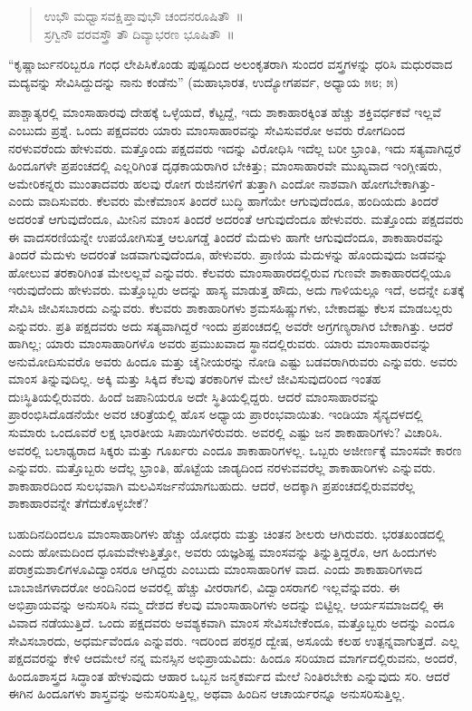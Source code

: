 \begin{verse}
ಉಭೌ ಮಧ್ವಾಸವಕ್ಷಿಪ್ತಾವುಭೌ ಚಂದನರೂಷಿತೌ~॥\\ಸ್ರಗ್ವಿನೌ ವರವಸ್ತ್ರೌ ತೌ ದಿವ್ಯಾಭರಣ ಭೂಷಿತೌ~॥
\end{verse}

“ಕೃಷ್ಣಾರ್ಜುನರಿಬ್ಬರೂ ಗಂಧ ಲೇಪಿಸಿಕೊಂಡು ಪುಷ್ಪದಿಂದ ಅಲಂಕೃತರಾಗಿ ಸುಂದರ ವಸ್ತ್ರಗಳನ್ನು ಧರಿಸಿ ಮಧುರವಾದ ಮದ್ಯವನ್ನು ಸೇವಿಸಿದ್ದುದನ್ನು ನಾನು ಕಂಡೆನು” (ಮಹಾಭಾರತ, ಉದ್ಯೋಗಪರ್ವ, ಅಧ್ಯಾಯ ೫೮; ೫)

ಪಾಶ್ಚಾತ್ಯರಲ್ಲಿ ಮಾಂಸಾಹಾರವು ದೇಹಕ್ಕೆ ಒಳ್ಳೆಯದೆ, ಕೆಟ್ಟದ್ದೆ, ಇದು ಶಾಕಾಹಾರಕ್ಕಿಂತ ಹೆಚ್ಚು ಶಕ್ತಿವರ್ಧಕವೆ ಇಲ್ಲವೆ ಎಂಬುದು ಪ್ರಶ್ನೆ. ಒಂದು ಪಕ್ಷದವರು ಯಾರು ಮಾಂಸಾಹಾರ\break ವನ್ನು ಸೇವಿಸುವರೋ ಅವರು ರೋಗದಿಂದ ನರಳುವರೆಂದು ಹೇಳುವರು. ಮತ್ತೊಂದು ಪಕ್ಷದವರು ಇದನ್ನು ವಿರೋಧಿಸಿ ಇದೆಲ್ಲ ಬರೀ ಭ್ರಾಂತಿ, ಇದು ಸತ್ಯವಾಗಿದ್ದರೆ ಹಿಂದೂಗಳೇ ಪ್ರಪಂಚದಲ್ಲಿ ಎಲ್ಲರಿಗಿಂತ ದೃಢಕಾಯರಾಗಿರ ಬೇಕಿತ್ತು; ಮಾಂಸಾಹಾರವೇ ಮುಖ್ಯವಾದ ಇಂಗ್ಲೀಷರು, ಅಮೇರಿಕನ್ನರು ಮುಂತಾದವರು ಹಲವು ರೋಗ ರುಜಿನಗಳಿಗೆ ತುತ್ತಾಗಿ ಎಂದೋ ನಾಶವಾಗಿ ಹೋಗಬೇಕಾಗಿತ್ತು- ಎಂದು ವಾದಿಸುವರು. ಕೆಲವರು ಮೇಕೆಮಾಂಸ ತಿಂದರೆ ಬುದ್ಧಿ ಹಾಗೆಯೇ ಆಗುವುದೆಂದೂ, ಹಂದಿಯದು ತಿಂದರೆ ಅದರಂತೆ ಆಗುವುದೆಂದೂ, ಮೀನಿನ ಮಾಂಸ ತಿಂದರೆ ಅದರಂತೆ ಆಗುವುದೆಂದೂ ಹೇಳುವರು. ಮತ್ತೊಂದು ಪಕ್ಷದವರು ಈ ವಾದಸರಣಿಯನ್ನೇ ಉಪಯೋಗಿಸುತ್ತ ಆಲೂಗಡ್ಡೆ ತಿಂದರೆ ಮೆದುಳು ಹಾಗೇ ಆಗುವುದೆಂದೂ, ಶಾಕಾಹಾರವನ್ನು ತಿಂದರೆ ಮೆದುಳು ಅದರಂತೆ ಜಡವಾಗುವುದೆಂದೂ, ಹೇಳುವರು. ಪ್ರಾಣಿಯ ಮೆದುಳನ್ನು ಹೊಂದುವುದು ಜಡವನ್ನು ಹೋಲುವ ತರಕಾರಿಗಿಂತ ಮೇಲಲ್ಲವೆ ಎನ್ನುವರು. ಕೆಲವರು ಮಾಂಸಾಹಾರದಲ್ಲಿರುವ ಗುಣವೇ ಶಾಕಾಹಾರದಲ್ಲಿಯೂ ಇರುವುದೆಂದು ಹೇಳುವರು. ಮತ್ತೊಬ್ಬರು ಅದನ್ನು ಹಾಸ್ಯ ಮಾಡುತ್ತ ಹೌದು, ಅದು ಗಾಳಿಯಲ್ಲೂ ಇದೆ, ಅದನ್ನೇ ಏತಕ್ಕೆ ಸೇವಿಸಿ ಜೀವಿಸಬಾರದು ಎನ್ನುವರು. ಕೆಲವರು ಶಾಕಾಹಾರಿಗಳು ಶ್ರಮಸಹಿಷ್ಣುಗಳು, ಬೇಕಾದಷ್ಟು ಕೆಲಸ ಮಾಡಬಲ್ಲರು ಎನ್ನುವರು. ಪ್ರತಿ ಪಕ್ಷದವರು ಅದು ಸತ್ಯವಾಗಿದ್ದರೆ ಇಂದು ಪ್ರಪಂಚದಲ್ಲಿ ಅವರೇ ಅಗ್ರಗಣ್ಯರಾಗಿರ ಬೇಕಾಗಿತ್ತು. ಆದರೆ ಹಾಗಿಲ್ಲ; ಯಾರು ಮಾಂಸಾಹಾರಿಗಳೊ ಅವರು ಪ್ರಮುಖವಾದ ಸ್ಥಾನದಲ್ಲಿರುವರು. ಯಾರು ಮಾಂಸಾಹಾರವನ್ನು ಅನುಮೋದಿಸುವರೊ ಅವರು ಹಿಂದೂ ಮತ್ತು ಚೈನೀಯರನ್ನು ನೋಡಿ ಎಷ್ಟು ಬಡವರಾಗಿರುವರು ಎನ್ನುವರು. ಅವರು ಮಾಂಸ ತಿನ್ನುವುದಿಲ್ಲ. ಅಕ್ಕಿ ಮತ್ತು ಸಿಕ್ಕಿದ ಕೆಲವು ತರಕಾರಿಗಳ ಮೇಲೆ ಜೀವಿಸುವುದರಿಂದ ಇಂತಹ ದುಃಸ್ಥಿತಿಯಲ್ಲಿರುವರು. ಹಿಂದೆ ಜಪಾನಿಯರೂ ಅದೇ ಸ್ಥಿತಿ\break ಯಲ್ಲಿದ್ದರು. ಆದರೆ ಮಾಂಸಾಹಾರವನ್ನು ಪ್ರಾರಂಭಿಸಿದೊಡನೆಯೇ ಅವರ ಚರಿತ್ರೆಯಲ್ಲಿ ಹೊಸ ಅಧ್ಯಾಯ ಪ್ರಾರಂಭವಾಯಿತು. ಇಂಡಿಯಾ ಸೈನ್ಯದಳದಲ್ಲಿ ಸುಮಾರು ಒಂದೂವರೆ ಲಕ್ಷ ಭಾರತೀಯ ಸಿಪಾಯಿಗಳಿರುವರು. ಅವರಲ್ಲಿ ಎಷ್ಟು ಜನ ಶಾಕಾಹಾರಿಗಳು? ವಿಚಾರಿಸಿ. ಅವರಲ್ಲಿ ಬಲಾಢ್ಯರಾದ ಸಿಕ್ಕರು ಮತ್ತು ಗೂರ್ಖರು ಎಂದೂ ಶಾಕಾಹಾರಿಗಳಲ್ಲ. ಒಬ್ಬರು ಅಜೀರ್ಣಕ್ಕೆ ಮಾಂಸವೇ ಕಾರಣ ಎನ್ನುವರು. ಮತ್ತೊಬ್ಬರು ಅದೆಲ್ಲ ಭ್ರಾಂತಿ, ಹೊಟ್ಟೆಯ ಜಾಡ್ಯದಿಂದ ನರಳುವವರೆಲ್ಲ ಶಾಕಾಹಾರಿಗಳು ಎನ್ನುವರು. ಶಾಕಾಹಾರದಿಂದ ಸುಲಭವಾಗಿ ಮಲವಿಸರ್ಜನೆಯಾಗಬಹುದು. ಆದರೆ, ಅದಕ್ಕಾಗಿ ಪ್ರಪಂಚದಲ್ಲಿರುವವರೆಲ್ಲ ಶಾಕಾಹಾರ\break ವನ್ನೇ ತೆಗೆದುಕೊಳ್ಳಬೇಕೆ?

ಬಹುದಿನದಿಂದಲೂ ಮಾಂಸಾಹಾರಿಗಳು ಹೆಚ್ಚು ಯೋಧರು ಮತ್ತು ಚಿಂತನ ಶೀಲರು ಆಗಿರುವರು. ಭರತಖಂಡದಲ್ಲಿ ಎಂದು ಹೋಮದಿಂದ ಧೂಮವೇಳುತ್ತಿತ್ತೋ, ಅವರು ಯಜ್ಞಶಿಷ್ಟ ಮಾಂಸವನ್ನು ತಿನ್ನುತ್ತಿದ್ದರೊ, ಆಗ ಹಿಂದುಗಳು ಪರಾಕ್ರಮಶಾಲಿಗಳೂ\break ವಿದ್ವಾಂಸರೂ ಆಗಿದ್ದರು ಎಂಬುದು ಮಾಂಸಾಹಾರಿಗಳ ವಾದ. ಎಂದು ಶಾಕಾಹಾರಿಗಳಾದ ಬಾಬಾಜಿಗಳಾದರೋ ಅಂದಿನಿಂದ ಅವರಲ್ಲಿ ಹೆಚ್ಚು ವೀರರಾಗಲಿ, ವಿದ್ವಾಂಸರಾಗಲಿ ಇಲ್ಲವೆನ್ನುವರು. ಈ ಅಭಿಪ್ರಾಯವನ್ನು ಅನುಸರಿಸಿ ನಮ್ಮ ದೇಶದ ಕೆಲವು ಮಾಂಸಾಹಾರಿ\break ಗಳು ಅದನ್ನು ಬಿಟ್ಟಿಲ್ಲ. ಆರ್ಯಸಮಾಜದಲ್ಲಿ ಈ ವಿವಾದ ನಡೆಯುತ್ತಿದೆ. ಒಂದು ಪಕ್ಷದವರು ಅವಶ್ಯಕವಾಗಿ ಮಾಂಸ ಸೇವಿಸಬೇಕೆಂದೂ, ಮತ್ತೊಬ್ಬರು ಅದನ್ನು ಎಂದೂ ಸೇವಿಸಬಾರದು, ಅಧರ್ಮವೆಂದೂ ಎನ್ನುವರು. ಇದರಿಂದ ಪರಸ್ಪರ ದ್ವೇಷ, ಅಸೂಯೆ ಕಲಹ ಉತ್ಪನ್ನವಾಗುತ್ತದೆ. ಎಲ್ಲ ಪಕ್ಷದವರನ್ನು ಕೇಳಿ ಆದಮೇಲೆ ನನ್ನ ಮನಸ್ಸಿನ ಅಭಿಪ್ರಾಯವಿದು: ಹಿಂದೂ ಸರಿಯಾದ ಮಾರ್ಗದಲ್ಲಿರುವನು, ಅಂದರೆ, ಹಿಂದೂಶಾಸ್ತ್ರದ ಸಿದ್ಧಾಂತ ಹೇಳುವುದು ಆಹಾರ ಒಬ್ಬನ ಜನ್ಮಕರ್ಮದ ಮೇಲೆ ನಿಂತಿರಬೇಕು ಎನ್ನುವುದು ಸರಿ. ಆದರೆ ಈಗಿನ ಹಿಂದೂಗಳು ಶಾಸ್ತ್ರವನ್ನು ಅನುಸರಿಸುತ್ತಿಲ್ಲ, ಅಥವಾ ಹಿಂದಿನ ಆಚಾರ್ಯರನ್ನೂ ಅನುಸರಿಸುತ್ತಿಲ್ಲ.

